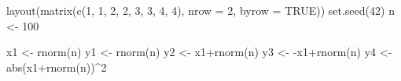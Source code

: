 \documentclass[
  letterpaper,
  DIV=11,
  numbers=noendperiod]{scrreprt}
\newenvironment{Shaded}{\begin{snugshade}}{\end{snugshade}}
\newcommand{\AttributeTok}[1]{\textcolor[rgb]{0.40,0.45,0.13}{#1}}
\newcommand{\ConstantTok}[1]{\textcolor[rgb]{0.56,0.35,0.01}{#1}}
\newcommand{\DecValTok}[1]{\textcolor[rgb]{0.68,0.00,0.00}{#1}}
\newcommand{\FunctionTok}[1]{\textcolor[rgb]{0.28,0.35,0.67}{#1}}
\newcommand{\NormalTok}[1]{\textcolor[rgb]{0.00,0.23,0.31}{#1}}
\newcommand{\OtherTok}[1]{\textcolor[rgb]{0.00,0.23,0.31}{#1}}
\newcommand{\SpecialCharTok}[1]{\textcolor[rgb]{0.37,0.37,0.37}{#1}}
\begin{document}
\begin{Shaded}
\begin{Highlighting}[]
\FunctionTok{layout}\NormalTok{(}\FunctionTok{matrix}\NormalTok{(}\FunctionTok{c}\NormalTok{(}\DecValTok{1}\NormalTok{, }\DecValTok{1}\NormalTok{, }\DecValTok{2}\NormalTok{, }\DecValTok{2}\NormalTok{, }\DecValTok{3}\NormalTok{, }\DecValTok{3}\NormalTok{, }\DecValTok{4}\NormalTok{, }\DecValTok{4}\NormalTok{), }\AttributeTok{nrow =} \DecValTok{2}\NormalTok{, }\AttributeTok{byrow =} \ConstantTok{TRUE}\NormalTok{)) }
\FunctionTok{set.seed}\NormalTok{(}\DecValTok{42}\NormalTok{)}
\NormalTok{n }\OtherTok{\textless{}{-}} \DecValTok{100}

\NormalTok{x1 }\OtherTok{\textless{}{-}} \FunctionTok{rnorm}\NormalTok{(n)}
\NormalTok{y1 }\OtherTok{\textless{}{-}} \FunctionTok{rnorm}\NormalTok{(n)}
\NormalTok{y2 }\OtherTok{\textless{}{-}}\NormalTok{ x1}\SpecialCharTok{+}\FunctionTok{rnorm}\NormalTok{(n)}
\NormalTok{y3 }\OtherTok{\textless{}{-}} \SpecialCharTok{{-}}\NormalTok{x1}\SpecialCharTok{+}\FunctionTok{rnorm}\NormalTok{(n)}
\NormalTok{y4 }\OtherTok{\textless{}{-}} \FunctionTok{abs}\NormalTok{(x1}\SpecialCharTok{+}\FunctionTok{rnorm}\NormalTok{(n))}\SpecialCharTok{\^{}}\DecValTok{2}


\end{Highlighting}
\end{Shaded}
\end{document}
